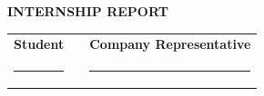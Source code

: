 \documentclass[a4paper]{article}
\renewcommand{\contentsname}{Table of Contents}
\renewcommand{\figurename}{Figure}
\renewcommand{\tablename}{Table}
\begin{document}
\renewcommand{\figurename}{Figure}
\renewcommand{\tablename}{Table}

\hypersetup{pageanchor=false}

\hypersetup{pageanchor=true}

\thispagestyle{empty}
\null
\newpage

\thispagestyle{empty}
\vspace*{\fill}
\begin{center}
{\fontsize{36}{44}\selectfont\bfseries INTERNSHIP REPORT\par}
\end{center}
\vspace*{\fill}
\clearpage

\renewcommand{\contentsname}{Table of Contents}
\tableofcontents
\clearpage




\newpage
\thispagestyle{empty}
\vspace*{1.5cm}
\begin{center}
\begin{tabular}{p{} p{} p{}}
\centering\textbf{Student} && \centering\arraybackslash\textbf{Company Representative}\\[3.5cm]
\centering \rule{5cm}{0.4pt} && \centering\arraybackslash \rule{5cm}{0.4pt}
\end{tabular}
\end{center}
\end{document}
